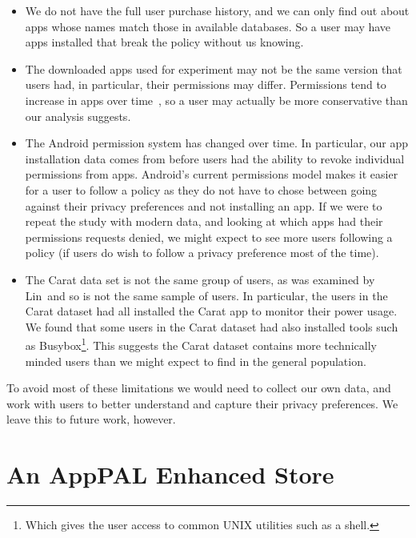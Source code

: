 \documentclass[thesis.tex]{subfiles}
\begin{document}
\begin{itemize}
\item We do not have the full user purchase history, and we can only
  find out about apps whose names match those in available databases. So
  a user may have apps installed that break the policy without us
  knowing.

\item The downloaded apps used for experiment may not be the same
  version that users had, in particular, their permissions may
  differ. Permissions tend to increase in apps over
  time~\cite{wei_permission_2012}, so a user may actually be more
  conservative than our analysis suggests.

\item The Android permission system has changed over time.  In
  particular, our app installation data comes from before users had the
  ability to revoke individual permissions from apps.  Android's current
  permissions model makes it easier for a user to follow a policy as
  they do not have to chose between going against their privacy
  preferences and not installing an app.  If we were to repeat the study
  with modern data, and looking at which apps had their permissions
  requests denied, we might expect to see more users following a policy
  (if users do wish to follow a privacy preference most of the time).

\item The Carat data set is not the same group of users, as was
  examined by Lin~\etal and so is not the same sample of users.  In
  particular, the users in the Carat dataset had all installed the Carat
  app to monitor their power usage.  We found that some users in the
  Carat dataset had also installed tools such as Busybox\footnote{Which
    gives the user access to common UNIX utilities such as a shell.}. This
  suggests the Carat dataset contains more technically minded users than
  we might expect to find in the general population.
\end{itemize}

To avoid most of these limitations we would need to collect our own
data, and work with users to better understand and capture their
privacy preferences.  We leave this to future work, however.

\section{An AppPAL Enhanced Store}
\label{sec:an-apppal-enhanced-store}
\end{document}

